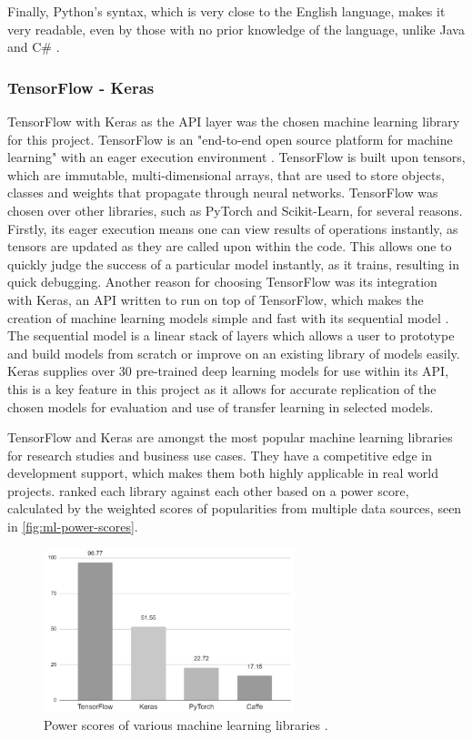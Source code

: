 Finally, Python’s syntax, which is very close to the English language, makes it very readable, even by those with no prior knowledge of the language, unlike Java and C\# \citep{srinath2017python}.

\subsubsection{TensorFlow - Keras}
TensorFlow with Keras as the API layer was the chosen machine learning library for this project. TensorFlow is an "end-to-end open source platform for machine learning" with an eager execution environment \citep{TensorFl5:online}. TensorFlow is built upon tensors, which are immutable, multi-dimensional arrays, that are used to store objects, classes and weights that propagate through neural networks. TensorFlow was chosen over other libraries, such as PyTorch and Scikit-Learn, for several reasons.  Firstly, its eager execution means one can view results of operations instantly, as tensors are updated as they are called upon within the code. This allows one to quickly judge the success of a particular model instantly, as it trains, resulting in quick debugging. Another reason for choosing TensorFlow was its integration with Keras, an API written to run on top of TensorFlow, which makes the creation of machine learning models simple and fast with its sequential model \citep{AboutKer65:online}. The sequential model is a linear stack of layers which allows a user to prototype and build models from scratch or improve on an existing library of models easily. Keras supplies over 30 pre-trained deep learning models for use within its API, this is a key feature in this project as it allows for accurate replication of the chosen models for evaluation and use of transfer learning in selected models.

TensorFlow and Keras are amongst the most popular machine learning libraries for research studies and business use cases. They have a competitive edge in development support, which makes them both highly applicable in real world projects. \cite{hale2018deep} ranked each library against each other based on a power score, calculated by the weighted scores of popularities from multiple data sources, seen in \autoref{fig:ml-power-scores}. 

\begin{figure}[H]
    \centering
    \includegraphics[width=0.65\textwidth]{figures/ml-power-sources.jpg}
    \caption{Power scores of various machine learning libraries \citep{hale2018deep}.}
    \label{fig:ml-power-scores}
\end{figure}

